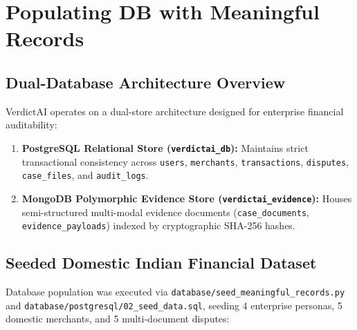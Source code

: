 \documentclass[11pt,a4paper]{article}
\begin{document}
\newpage

\section{Populating DB with Meaningful Records}

\subsection{Dual-Database Architecture Overview}
VerdictAI operates on a dual-store architecture designed for enterprise financial auditability:
\begin{enumerate}
    \item \textbf{PostgreSQL Relational Store (\texttt{verdictai\_db}):} Maintains strict transactional consistency across \texttt{users}, \texttt{merchants}, \texttt{transactions}, \texttt{disputes}, \texttt{case\_files}, and \texttt{audit\_logs}.
    \item \textbf{MongoDB Polymorphic Evidence Store (\texttt{verdictai\_evidence}):} Houses semi-structured multi-modal evidence documents (\texttt{case\_documents}, \texttt{evidence\_payloads}) indexed by cryptographic SHA-256 hashes.
\end{enumerate}

\subsection{Seeded Domestic Indian Financial Dataset}
Database population was executed via \texttt{database/seed\_meaningful\_records.py} and \texttt{database/postgresql/02\_seed\_data.sql}, seeding 4 enterprise personas, 5 domestic merchants, and 5 multi-document disputes:
\end{document}
